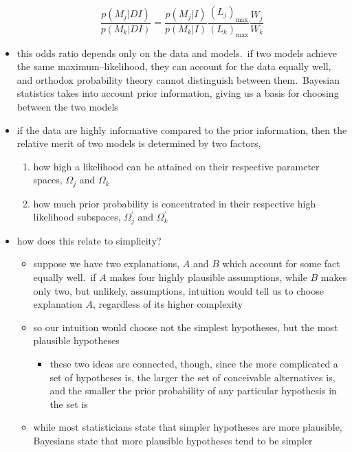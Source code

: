 \documentclass[../jaynes_prob_theory_notes.tex]{subfiles}
\begin{document}
\begin{itemize}
                        \begin{equation} 
                            \label{unknown_odds_ratio}
                            \frac{p(M_j|DI)}{p(M_k|DI)} = \frac{p(M_j|I)}{p(M_k|I)}\frac{{(L_j)}_{\max}}{{(L_k)}_{\max}}\frac{W_j}{W_k}
                        \end{equation}
                    \item this odds ratio depends only on the data and models.\ if two models achieve the same maximum--likelihood, they can account for the data equally well, and orthodox probability theory cannot distinguish between them.\ Bayesian statistics takes into account prior information, giving us a basis for choosing between the two models
                    \item if the data are highly informative compared to the prior information, then the relative merit of two models is determined by two factors,
                        \begin{enumerate}
                            \item how high a likelihood can be attained on their respective parameter spaces, \(\Omega_j\) and \(\Omega_k\) 
                            \item how much prior probability is concentrated in their respective high--likelihood subspaces, \(\Omega^{\prime}_j\) and \(\Omega^{\prime}_k\) 
                        \end{enumerate}
                    \item how does this relate to simplicity?
                        \begin{itemize} 
                            \item suppose we have two explanations, \(A\) and \(B\) which account for some fact equally well.\ if \(A\) makes four highly plausible assumptions, while \(B\) makes only two, but unlikely, assumptions, intuition would tell us to choose explanation \(A\), regardless of its higher complexity
                            \item so our intuition would choose not the simplest hypotheses, but the most plausible hypotheses
                                \begin{itemize} 
                                    \item these two ideas are connected, though, since the more complicated a set of hypotheses is, the larger the set of conceivable alternatives is, and the smaller the prior probability of any particular hypothesis in the set is
                                \end{itemize}
                            \item while most statisticians state that simpler hypotheses are more plausible, Bayesians state that more plausible hypotheses tend to be simpler
                        \end{itemize}
                \end{itemize}
\end{document}
